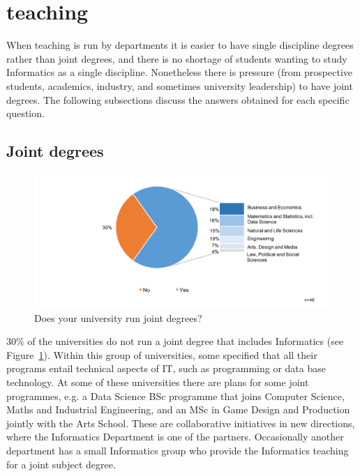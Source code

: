 \section{teaching}

When teaching is run by departments it is easier to have single discipline degrees rather than joint degrees, and there is no shortage of students wanting to study Informatics as a single discipline. Nonetheless there is pressure (from prospective students, academics, industry, and sometimes university leadership) to have joint degrees. The 
following subsections discuss the answers obtained for each specific
question.

\subsection {Joint degrees}

\begin{figure}[h]
\includegraphics[width = \linewidth]{charts/2a.png}
\caption{Does your university run joint degrees?}
\label{sect3:joint}
\end{figure}

30\% of the universities do not run a joint degree that includes Informatics (see Figure~\ref{sect3:joint}). Within this group of universities, some specified that all their programs entail technical aspects of IT, such as programming or data base technology.  At some of these universities there are plans for some joint programmes, e.g. a Data Science BSc programme that joins Computer Science, Maths and Industrial Engineering, and an MSc in Game Design and Production jointly with the Arts School.  These are collaborative initiatives in new directions, where the Informatics Department is one of the partners. Occasionally another department has a small Informatics group who provide the Informatics teaching for a joint subject degree.

